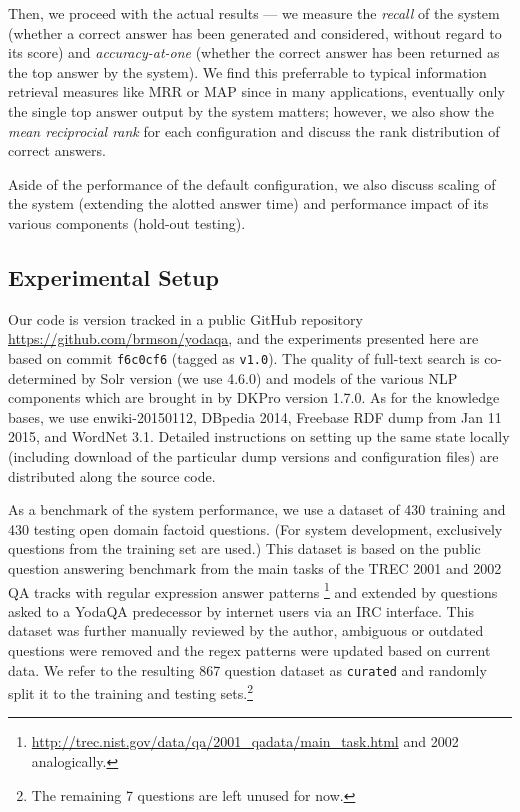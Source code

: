 \documentclass{poster15}
\begin{document}
Then, we proceed with the actual results --- we measure the \textit{recall}
of the system (whether a correct answer has been generated and considered,
without regard to its score) and \textit{accuracy-at-one} (whether the
correct answer has been returned as the top answer by the system).
We find this preferrable to typical information retrieval measures like MRR or MAP
since in many applications, eventually only the single top answer output by the system
matters; however, we also show the \textit{mean reciprocial rank}
for each configuration and discuss the rank distribution of correct answers.

Aside of the performance of the default configuration, we also discuss
scaling of the system (extending the alotted answer time) and performance
impact of its various components (hold-out testing).

\subsection{Experimental Setup}

Our code is version tracked in a public GitHub repository
\url{https://github.com/brmson/yodaqa}, and the experiments presented
here are based on commit \texttt{f6c0cf6} (tagged as \texttt{v1.0}).
The quality of full-text search is co-determined by Solr version
(we use 4.6.0) and models of the various NLP components which are brought
in by DKPro version 1.7.0.
As for the knowledge bases, we use enwiki-20150112, DBpedia 2014,
Freebase RDF dump from Jan 11 2015, and WordNet 3.1.
Detailed instructions on setting up the same state locally (including
download of the particular dump versions and configuration files) are
distributed along the source code.

As a benchmark of the system performance, we use a dataset of 430 training
and 430 testing open domain factoid questions.
(For system development, exclusively questions from the training set are used.)
This dataset is based on the public question answering benchmark from
the main tasks of the TREC 2001 and 2002 QA tracks
with regular expression answer patterns%
\footnote{\url{http://trec.nist.gov/data/qa/2001_qadata/main_task.html} and 2002 analogically.}
and extended by questions asked
to a YodaQA predecessor by internet users via an IRC interface.
This dataset was further manually reviewed by the author,
ambiguous or outdated questions were removed
and the regex patterns were updated based on current data.
We refer to the resulting 867 question dataset as \texttt{curated} and
randomly split it to the training and testing sets.\footnote{The remaining
7 questions are left unused for now.}
\end{document}
